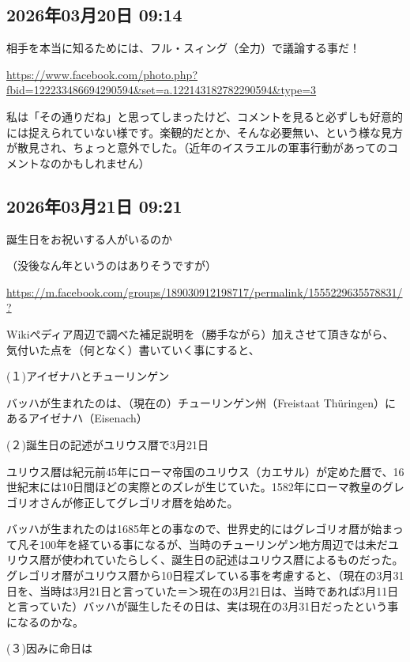 \subsection*{2026年03月20日 09:14}

相手を本当に知るためには、フル・スィング（全力）で議論する事だ！

\url{https://www.facebook.com/photo.php?fbid=122233486694290594&set=a.122143182782290594&type=3}

私は「その通りだね」と思ってしまったけど、コメントを見ると必ずしも好意的には捉えられていない様です。楽観的だとか、そんな必要無い、という様な見方が散見され、ちょっと意外でした。（近年のイスラエルの軍事行動があってのコメントなのかもしれません）

\subsection*{2026年03月21日 09:21}

誕生日をお祝いする人がいるのか

（没後なん年というのはありそうですが）

\url{https://m.facebook.com/groups/189030912198717/permalink/1555229635578831/?}

Wikiぺディア周辺で調べた補足説明を（勝手ながら）加えさせて頂きながら、気付いた点を（何となく）書いていく事にすると、

(１)アイゼナハとチューリンゲン

バッハが生まれたのは、（現在の）チューリンゲン州（Freistaat Thüringen）にあるアイゼナハ（Eisenach）

(２)誕生日の記述がユリウス暦で3月21日

ユリウス暦は紀元前45年にローマ帝国のユリウス（カエサル）が定めた暦で、16世紀末には10日間ほどの実際とのズレが生じていた。1582年にローマ教皇のグレゴリオさんが修正してグレゴリオ暦を始めた。

バッハが生まれたのは1685年との事なので、世界史的にはグレゴリオ暦が始まって凡そ100年を経ている事になるが、当時のチューリンゲン地方周辺では未だユリウス暦が使われていたらしく、誕生日の記述はユリウス暦によるものだった。グレゴリオ暦がユリウス暦から10日程ズレている事を考慮すると、（現在の3月31日を、当時は3月21日と言っていた＝＞現在の3月21日は、当時であれば3月11日と言っていた）バッハが誕生したその日は、実は現在の3月31日だったという事になるのかな。

(３)因みに命日は

